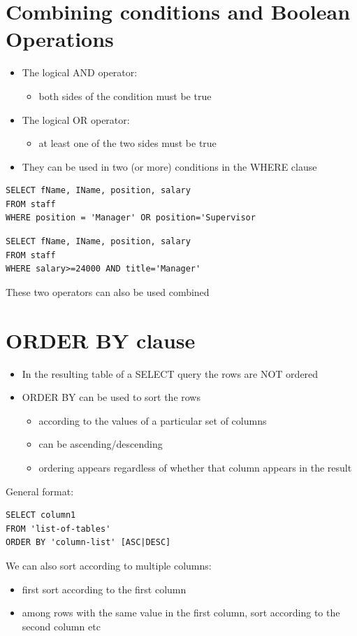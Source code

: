 \documentclass{article}[18pt]
\begin{document}
\section{Combining conditions and Boolean Operations}
\begin{itemize}
	\item The logical AND operator:
	\begin{itemize}
		\item both sides of the condition must be true
	\end{itemize}
	\item The logical OR operator:
	\begin{itemize}
		\item at least one of the two sides must be true
	\end{itemize}
	\item They can be used in two (or more) conditions in the WHERE clause
\end{itemize}
\begin{verbatim}
SELECT fName, IName, position, salary
FROM staff
WHERE position = 'Manager' OR position='Supervisor
\end{verbatim}
\begin{verbatim}
SELECT fName, IName, position, salary
FROM staff
WHERE salary>=24000 AND title='Manager'
\end{verbatim}
These two operators can also be used combined
\section{ORDER BY clause}
\begin{itemize}
	\item In the resulting table of a SELECT query the rows are NOT ordered
	\item ORDER BY can be used to sort the rows
	\begin{itemize}
		\item according to the values of a particular set of columns
		\item can be ascending/descending
		\item ordering appears regardless of whether that column appears in the result
	\end{itemize}
\end{itemize}
General format:
\begin{verbatim}
SELECT column1
FROM 'list-of-tables'
ORDER BY 'column-list' [ASC|DESC]
\end{verbatim}
We can also sort according to multiple columns:
\begin{itemize}
	\item first sort according to the first column
	\item among rows with the same value in the first column, sort according to the second column etc
\end{itemize}
\end{document}
